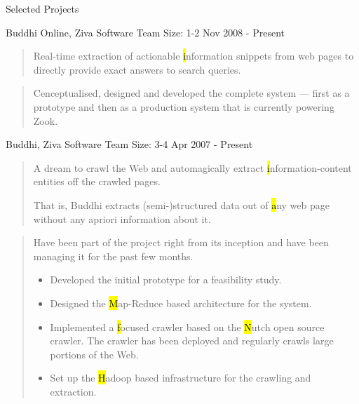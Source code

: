 \documentclass{resume}
\newcommand{\teamsize}{\hfill\sc\footnotesize Team Size: }
\begin{document}
\begin{category}{Selected Projects}{}

    \item {\topic Buddhi Online,} Ziva Software
        {\teamsize 1-2}
        {\period Nov 2008 - Present}

        \begin{quote}
            Real-time extraction of actionable {\hl information snippets} from
            web pages to directly provide exact answers to search queries.
        \end{quote}

        \begin{quote}
            Cenceptualised, designed and developed the complete system ---
            first as a prototype and then as a production system that is
            currently powering Zook.
        \end{quote}

    \item {\topic Buddhi,} Ziva Software
        {\teamsize 3-4}
        {\period Apr 2007 - Present}

        \begin{quote}
            A dream to crawl the Web and automagically extract {\hl
            information-content entities} off the crawled pages.

            That is, Buddhi extracts (semi-)structured data out of {\hl
            any} web page without any apriori information about it.
        \end{quote}

        \begin{quote}
            Have been part of the project right from its inception and have
            been managing it for the past few months.
            \begin{itemize}
                \item Developed the initial prototype for a feasibility study.
                \item Designed the {\hl Map-Reduce} based architecture for the
                    system.
                \item Implemented a {\hl focused crawler} based on the {\hl
                    Nutch} open source crawler. The crawler has been deployed
                    and regularly crawls large portions of the Web.
                \item Set up the {\hl Hadoop} based infrastructure for the
                    crawling and extraction.
            \end{itemize}
        \end{quote}


\end{category}
\end{document}

